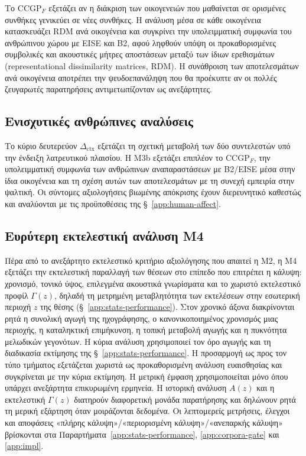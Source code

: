 \documentclass[11pt,a4paper]{article}
\begin{document}
Το $\mathrm{CCGP}_F$ εξετάζει αν η διάκριση των οικογενειών που μαθαίνεται σε ορισμένες συνθήκες γενικεύει σε νέες συνθήκες. Η ανάλυση μέσα σε κάθε οικογένεια κατασκευάζει RDM ανά οικογένεια και συγκρίνει την υπολειμματική συμφωνία του ανθρώπινου χώρου με EISE και B2, αφού ληφθούν υπόψη οι προκαθορισμένες συμβολικές και ακουστικές μήτρες αποστάσεων μεταξύ των ίδιων ερεθισμάτων (representational dissimilarity matrices, RDM). Η συνάθροιση των αποτελεσμάτων ανά οικογένεια αποτρέπει την ψευδοεπανάληψη που θα προέκυπτε αν οι πολλές ζευγαρωτές παρατηρήσεις αντιμετωπίζονταν ως ανεξάρτητες.

\subsection{Ενισχυτικές ανθρώπινες αναλύσεις}\label{sec:human-secondary}

Το κύριο δευτερεύον $\Delta_{\mathrm{ctx}}$ εξετάζει τη σχετική μεταβολή των δύο συντελεστών υπό την ένδειξη λατρευτικού πλαισίου. Η M3b εξετάζει επιπλέον το $\mathrm{CCGP}_F$, την υπολειμματική συμφωνία των ανθρώπινων αναπαραστάσεων με B2/EISE μέσα στην ίδια οικογένεια και τη σχέση αυτών των αποτελεσμάτων με τη συνεχή εμπειρία στην ψαλτική. Οι σύντομες αξιολογήσεις βιωμένης απόκρισης έχουν διερευνητικό καθεστώς και αναλύονται με τις προϋποθέσεις της §~\ref{app:human-affect}.

\subsection{Ευρύτερη εκτελεστική ανάλυση M4}\label{sec:m4-broader}

Πέρα από το ανεξάρτητο εκτελεστικό κριτήριο αξιολόγησης που απαιτεί η M2, η M4 εξετάζει την εκτελεστική παραλλαγή των θέσεων στο επίπεδο που επιτρέπει η κάλυψη: χρονισμό, τονικό ύψος, επιλεγμένα ακουστικά γνωρίσματα και το χωριστό εκτελεστικό προφίλ $\Gamma(z)$, δηλαδή τη μετρημένη μεταβλητότητα των εκτελέσεων στην εσωτερική περιοχή $z$ της θέσης (§~\ref{app:stats-performance}). Στον χρονικό άξονα διακρίνονται ρητά η συνολική αγωγή της ηχογράφησης, ο κανονικοποιημένος χρονισμός μιας περιοχής, η καταληκτική επιμήκυνση, η τοπική μεταβολή αγωγής και η πυκνότητα μελωδικών γεγονότων. Η κύρια ανάλυση χρησιμοποιεί τον όρο αγωγής και τη διαδικασία εκτίμησης της §~\ref{app:stats-performance}. Η προσαρμογή ως προς τον τύπο τμήματος εξετάζεται χωριστά ως προκαθορισμένη ανάλυση ευαισθησίας και συγκρίνεται με την κύρια εκτίμηση. Η μετρική έμφαση χρησιμοποιείται μόνο όπου υπάρχει ανεξάρτητα επικυρωμένη ερμηνεία. Η ιστορική ανάλυση $A(z)$ και η εκτελεστική $\Gamma(z)$ διατηρούν διαφορετική μονάδα παρατήρησης και δηλώνουν ρητά τη μερική εξάρτηση όταν μοιράζονται δεδομένα. Οι λεπτομερείς μετρήσεις, έλεγχοι και αποφάσεις «πλήρης κάλυψη»/«περιορισμένη κάλυψη»/«ανεπαρκής κάλυψη» βρίσκονται στα Παραρτήματα~\ref{app:stats-performance}, \ref{app:corpora-gate} και \ref{app:impl}.
\end{document}

